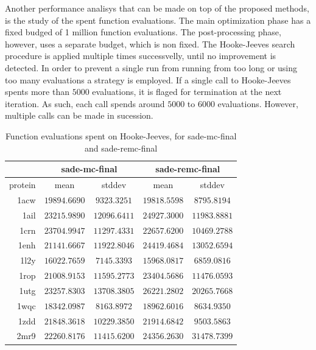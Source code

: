 Another performance analisys that can be made on top of the proposed methods,
is the study of the spent function evaluations. The main optimization phase has
a fixed budged of 1 million function evaluations. The post-processing phase,
however, uses a separate budget, which is non fixed. The Hooke-Jeeves
search procedure is applied multiple times successvelly, until no improvement
is detected. In order to prevent a single run from running from too long or
using too many evaluations a strategy is employed. If a single call to
Hooke-Jeeves spents more than $5000$ evaluations, it is flaged for termination
at the next iteration. As such, each call spends around $5000$ to $6000$
evaluations. However, multiple calls can be made in sucession.

\begin{table}
  \centering
  \begin{tabular}{r|c|c||c|c}
            & \multicolumn{2}{c}{sade-mc-final} & \multicolumn{2}{||c}{sade-remc-final} \\ \hline
    protein & mean         & stddev       & mean         & stddev \\ \hline \hline
    1acw    & $19894.6690$ & $9323.3251$  & $19818.5598$ & $8795.8194$  \\ \hline
    1ail    & $23215.9890$ & $12096.6411$ & $24927.3000$ & $11983.8881$ \\ \hline
    1crn    & $23704.9947$ & $11297.4331$ & $22657.6200$ & $10469.2788$ \\ \hline
    1enh    & $21141.6667$ & $11922.8046$ & $24419.4684$ & $13052.6594$ \\ \hline
    1l2y    & $16022.7659$ & $7145.3393$  & $15968.0817$ & $6859.0816$  \\ \hline
    1rop    & $21008.9153$ & $11595.2773$ & $23404.5686$ & $11476.0593$ \\ \hline
    1utg    & $23257.8303$ & $13708.3805$ & $26221.2802$ & $20265.7668$ \\ \hline
    1wqc    & $18342.0987$ & $8163.8972$  & $18962.6016$ & $8634.9350$  \\ \hline
    1zdd    & $21848.3618$ & $10229.3850$ & $21914.6842$ & $9503.5863$  \\ \hline
    2mr9    & $22260.8176$ & $11415.6200$ & $24356.2630$ & $31478.7399$ \\ \hline
  \end{tabular}
  \caption{Function evaluations spent on Hooke-Jeeves, for sade-mc-final and sade-remc-final}
  \label{tab:spent-evals}
\end{table}

